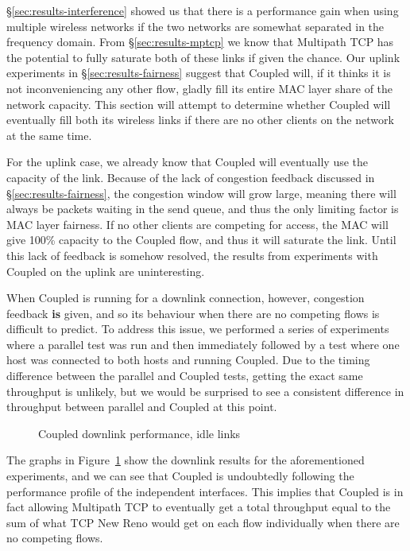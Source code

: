\S\ref{sec:results-interference} showed us that there is a performance
gain when using multiple wireless networks if the two networks are somewhat 
separated in the frequency domain. From \S\ref{sec:results-mptcp} we know that 
Multipath TCP has the potential to fully saturate both of these links if given 
the chance. Our uplink experiments in \S\ref{sec:results-fairness} suggest that 
Coupled will, if it thinks it is not inconveniencing any other flow, gladly fill 
its entire MAC layer share of the network capacity. This section will attempt to 
determine whether Coupled will eventually fill both its wireless links if there 
are no other clients on the network at the same time.

For the uplink case, we already know that Coupled will eventually use the
capacity of the link. Because of the lack of congestion feedback discussed in
\S\ref{sec:results-fairness}, the congestion window will grow large,
meaning there will always be packets waiting in the send queue, and thus the
only limiting factor is MAC layer fairness. If no other clients are competing
for access, the MAC will give 100\% capacity to the Coupled flow, and thus it
will saturate the link. Until this lack of feedback is somehow resolved, the 
results from experiments with Coupled on the uplink are uninteresting. %

When Coupled is running for a downlink connection, however, congestion feedback
\textbf{is} given, and so its behaviour when there are no competing flows is 
difficult to predict. To address this issue, we performed a series of 
experiments where a parallel test was run and then immediately followed by a 
test where one host was connected to both hosts and running Coupled. Due to the 
timing difference between the parallel and Coupled tests, getting the exact same 
throughput is unlikely, but we would be surprised to see a consistent difference 
in throughput between parallel and Coupled at this point.

\begin{figure}[h]
 \centering
 
 \caption{Coupled downlink performance, idle links}\label{graph:coupled-performance}
\end{figure}

The graphs in Figure~\ref{graph:coupled-performance} show the downlink results
for the aforementioned experiments, and we can see that Coupled is undoubtedly
following the performance profile of the independent interfaces. This implies
that Coupled is in fact allowing Multipath TCP to eventually get a total
throughput equal to the sum of what TCP New Reno would get on each flow
individually when there are no competing flows.
